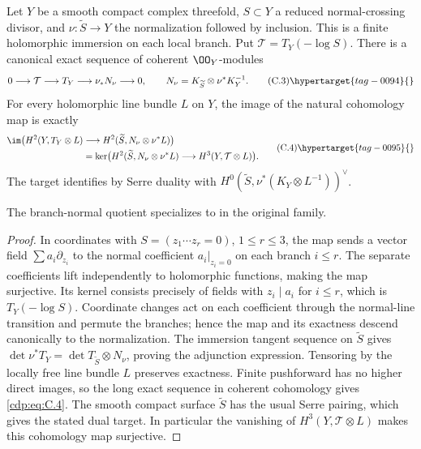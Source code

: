 \begin{proposition}\hypertarget{tag-01FR}{}\label{cdp:st:C5a}

Let $Y$ be a smooth compact complex threefold, $S\subset Y$ a reduced normal-crossing divisor, and $\nu:\widetilde S\to Y$ the normalization followed by inclusion. This is a finite holomorphic immersion on each local branch. Put $\mathcal T=T_Y(-\log S)$. There is a canonical exact sequence of coherent $\OO_Y$-modules
\[
0\longrightarrow\mathcal T\longrightarrow T_Y
 \longrightarrow\nu_*N_\nu\longrightarrow0,
\qquad N_\nu=K_{\widetilde S}\otimes\nu^*K_Y^{-1}.      \tag{C.3}\hypertarget{tag-0094}{}\label{cdp:eq:C.3}
\]
For every holomorphic line bundle $L$ on $Y$, the image of the natural cohomology map is exactly
\[
\begin{split}
\im\bigl(H^2(Y,T_Y\otimes L)&\longrightarrow
 H^2(\widetilde S,N_\nu\otimes\nu^*L)\bigr)\\
 &=\ker\bigl(H^2(\widetilde S,N_\nu\otimes\nu^*L)
 \longrightarrow H^3(Y,\mathcal T\otimes L)\bigr).
\end{split}                                             \tag{C.4}\hypertarget{tag-0095}{}\label{cdp:eq:C.4}
\]
The target identifies by Serre duality with
$H^0(\widetilde S,\nu^*(K_Y\otimes L^{-1}))^\vee$.
\end{proposition}


The branch-normal quotient specializes to \citet[Lemma~6.11, p.~81]{DGKXv1} in the original family.

\begin{proof}
In coordinates with $S=(z_1\cdots z_r=0)$, $1\le r\le3$, the map sends a vector field $\sum a_i\partial_{z_i}$ to the normal coefficient $a_i|_{z_i=0}$ on each branch $i\le r$. The separate coefficients lift independently to holomorphic functions, making the map surjective. Its kernel consists precisely of fields with $z_i\mid a_i$ for $i\le r$, which is $T_Y(-\log S)$. Coordinate changes act on each coefficient through the normal-line transition and permute the branches; hence the map and its exactness descend canonically to the normalization. The immersion tangent sequence on $\widetilde S$ gives $\det\nu^*T_Y=\det T_{\widetilde S}\otimes N_\nu$, proving the adjunction expression. Tensoring by the locally free line bundle $L$ preserves exactness. Finite pushforward has no higher direct images, so the long exact sequence in coherent cohomology gives \eqref{cdp:eq:C.4}. The smooth compact surface $\widetilde S$ has the usual Serre pairing, which gives the stated dual target. In particular the vanishing of $H^3(Y,\mathcal T\otimes L)$ makes this cohomology map surjective.

\end{proof}